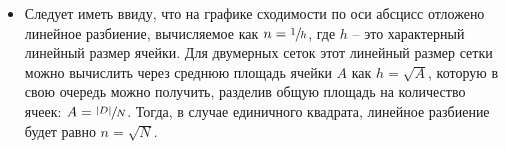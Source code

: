 \begin{itemize}
\item
Следует иметь ввиду, что на графике сходимости
по оси абсцисс отложено линейное разбиение, вычисляемое как
$n=\sfrac{1}{h}$, где $h$ -- это характерный линейный размер ячейки.
Для двумерных сеток этот линейный размер
сетки можно вычислить через среднюю площадь ячейки $A$ как $h = \sqrt{A}$,
которую в свою очередь можно получить, разделив общую площадь на количество
ячеек: $A = \sfrac{|D|}{N}$. Тогда, в случае единичного квадрата, линейное разбиение будет равно $n = \sqrt{N}$.

\end{itemize}
